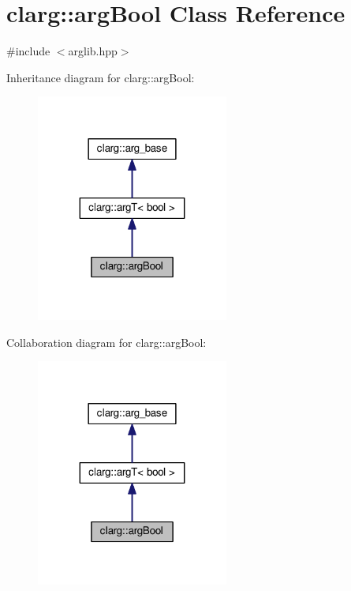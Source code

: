 \hypertarget{classclarg_1_1arg_bool}{}\section{clarg\+:\+:arg\+Bool Class Reference}
\label{classclarg_1_1arg_bool}


{\ttfamily \#include $<$arglib.\+hpp$>$}



Inheritance diagram for clarg\+:\+:arg\+Bool\+:\nopagebreak
\begin{figure}[H]
\begin{center}
\leavevmode
\includegraphics[width=179pt]{classclarg_1_1arg_bool__inherit__graph}
\end{center}
\end{figure}


Collaboration diagram for clarg\+:\+:arg\+Bool\+:\nopagebreak
\begin{figure}[H]
\begin{center}
\leavevmode
\includegraphics[width=179pt]{classclarg_1_1arg_bool__coll__graph}
\end{center}
\end{figure}

